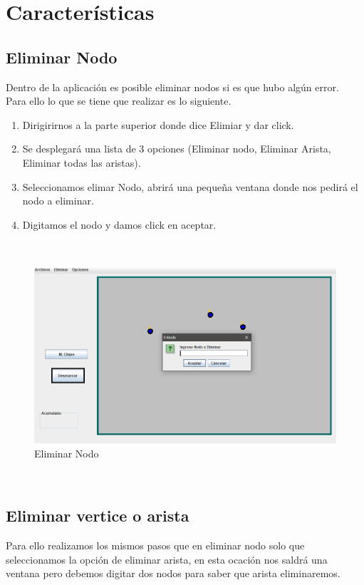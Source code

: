 \section{Características}
\subsection{Eliminar Nodo}
Dentro de la aplicación es posible eliminar nodos si es que hubo algún error.\\
Para ello lo que se tiene que realizar es lo siguiente. 
 \begin{enumerate}
     \item Dirigirirnos a la parte superior donde dice Elimiar y dar click. 
     \item Se desplegará una lista de 3 opciones (Eliminar nodo, Eliminar Arista, Eliminar todas las aristas).
     \item Seleccionamos elimar Nodo, abrirá una pequeña ventana donde nos pedirá el nodo a eliminar.
     \item Digitamos el nodo y damos click en aceptar.
 \end{enumerate}
 \\
\begin{figure}[h!]
\centering
\includegraphics[scale=.55]{img/delete.PNG}
\caption{Eliminar Nodo}
\label{Comandos}
\end{figure}

\\
\subsection{Eliminar vertice o arista}
Para ello realizamos los mismos pasos que en eliminar nodo solo que seleccionamos la opción de eliminar arista, en esta ocación nos saldrá una ventana pero debemos digitar dos nodos para saber que arista eliminaremos.

